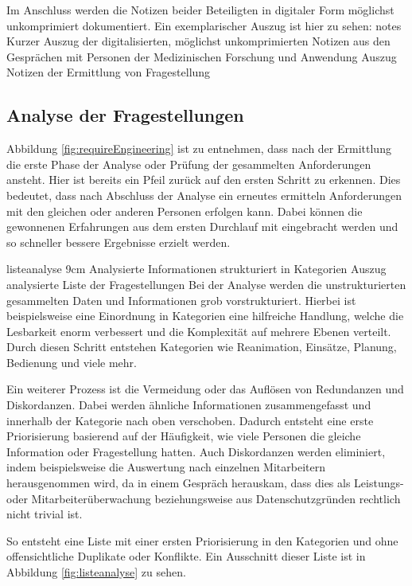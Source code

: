 Im Anschluss werden die Notizen beider Beteiligten in digitaler Form möglichst unkomprimiert dokumentiert.
Ein exemplarischer Auszug ist hier zu sehen: 
\bildbreit
{notes}
{Kurzer Auszug der digitalisierten, möglichst unkomprimierten Notizen aus den Gesprächen mit Personen der \glqq Medizinischen Forschung und Anwendung\grqq}
{Auszug Notizen der Ermittlung von Fragestellung}



\subsection{Analyse der Fragestellungen}
\label{sub:analyseFragen}
Abbildung \ref{fig:requireEngineering} ist zu entnehmen, dass nach der Ermittlung die erste Phase der Analyse oder Prüfung der gesammelten Anforderungen ansteht.
Hier ist bereits ein Pfeil zurück auf den ersten Schritt zu erkennen.
Dies bedeutet, dass nach Abschluss der Analyse ein erneutes ermitteln Anforderungen mit den gleichen oder anderen Personen erfolgen kann.
Dabei können die gewonnenen Erfahrungen aus dem ersten Durchlauf mit eingebracht werden und so schneller bessere Ergebnisse erzielt werden.

\bild
{listeanalyse}
{9cm}
{Analysierte Informationen strukturiert in Kategorien}
{Auszug analysierte Liste der Fragestellungen}
Bei der Analyse werden die unstrukturierten gesammelten Daten und Informationen grob vorstrukturiert.
Hierbei ist beispielsweise eine Einordnung in Kategorien eine hilfreiche Handlung, welche die Lesbarkeit enorm verbessert und die Komplexität auf mehrere Ebenen verteilt.
Durch diesen Schritt entstehen Kategorien wie Reanimation, Einsätze, Planung, Bedienung und viele mehr.

Ein weiterer Prozess ist die Vermeidung oder das Auflösen von Redundanzen und Diskordanzen.
Dabei werden ähnliche Informationen zusammengefasst und innerhalb der Kategorie nach oben verschoben.
Dadurch entsteht eine erste Priorisierung basierend auf der Häufigkeit, wie viele Personen die gleiche Information oder Fragestellung hatten.
Auch Diskordanzen werden eliminiert, indem beispielsweise die Auswertung nach einzelnen Mitarbeitern herausgenommen wird, da in einem Gespräch herauskam, dass dies als Leistungs- oder Mitarbeiterüberwachung beziehungsweise aus Datenschutzgründen rechtlich nicht trivial ist.

So entsteht eine Liste mit einer ersten Priorisierung in den Kategorien und ohne offensichtliche Duplikate oder Konflikte.
Ein Ausschnitt dieser Liste ist in Abbildung \ref{fig:listeanalyse} zu sehen.
\clearpage
